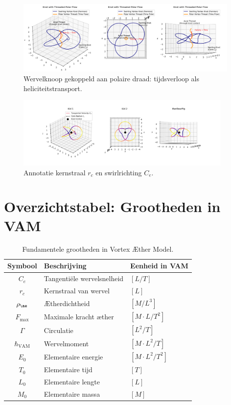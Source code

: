 \documentclass{article}
\begin{document}
    \begin{figure}[h!]
        \centering
        \includegraphics[width=0.98\textwidth]{KnotThreadedPolarFlow.png}
        \caption{Wervelknoop gekoppeld aan polaire draad: tijdsverloop als heliciteitstransport.}
    \end{figure}

    \begin{figure}[h!]
        \centering
        \includegraphics[width=0.95\textwidth]{vortex_knot_diagram.png}
        \caption{Annotatie kernstraal $r_c$ en swirlrichting $C_e$.}
    \end{figure}

    \section{Overzichtstabel: Grootheden in VAM}
    \begin{table}[h!]
        \centering
        \begin{tabular}{|c|l|l|}
            \hline
            \textbf{Symbool} & \textbf{Beschrijving} & \textbf{Eenheid in VAM} \\
            \hline
            $C_e$ & Tangentiële wervelsnelheid & $[L/T]$ \\
            $r_c$ & Kernstraal van wervel & $[L]$ \\
            $\rho_{\ae}$ & Ætherdichtheid & $[M/L^3]$ \\
            $F_\text{max}$ & Maximale kracht æther & $[M \cdot L/T^2]$ \\
            $\Gamma$ & Circulatie & $[L^2/T]$ \\
            $\hbar_\text{VAM}$ & Wervelmoment & $[M \cdot L^2 / T]$ \\
            $E_0$ & Elementaire energie & $[M \cdot L^2 / T^2]$ \\
            $T_0$ & Elementaire tijd & $[T]$ \\
            $L_0$ & Elementaire lengte & $[L]$ \\
            $M_0$ & Elementaire massa & $[M]$ \\
            \hline
        \end{tabular}
        \caption{Fundamentele grootheden in Vortex Æther Model.}
    \end{table}


    
    
    
    
    
    

    
    \printbibliography
\end{document}
